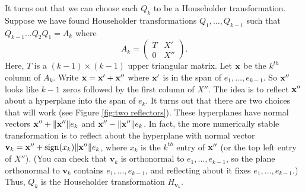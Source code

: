 It turns out that we can choose each $Q_k$ to be a Householder transformation. 
Suppose we have found Householder transformations $Q_1, \ldots, Q_{k-1}$ such that $Q_{k-1}\ldots Q_2Q_1 = A_k$ where 
\[
A_k = \begin{pmatrix}
T & X' \\
0 & X''
\end{pmatrix}.
\]
Here, $T$ is a $(k-1) \times (k-1)$ upper triangular matrix. 
Let ${\bf x}$ be the $k^{th}$ column of $A_k$. 
Write ${\bf x} = {\bf x}' + {\bf x}''$ where ${\bf x}'$ is in the span of $e_1, \ldots, e_{k-1}$. 
So ${\bf x}''$ looks like $k-1$ zeros followed by the first column of $X''$. 
The idea is to reflect ${\bf x}''$ about a hyperplane into the span of $e_k$. 
It turns out that there are two choices that will work (see Figure \ref{fig:two reflectors}). 
These hyperplanes have normal vectors ${\bf x}'' + \| {\bf x}'' \|e_k$ and ${\bf x}'' - \| {\bf x}'' \|e_k$.
In fact, the more numerically stable transformation is to reflect about the hyperplane with normal vector $\mathbf{v}_k = {\bf x}'' +\operatorname{sign}(x_k) \| {\bf x}'' \|e_k$, where $x_k$ is the $k^{th}$ entry of ${\bf x}''$ (or the top left entry of $X''$). 
(You can check that $\mathbf{v}_k$ is orthonormal to $e_1, \ldots, e_{k-1}$, so the plane orthonormal to $\mathbf{v}_k$ contains $e_1, \ldots, e_{k-1}$, and reflecting about it fixes $e_1, \ldots, e_{k-1}$.)
Thus, $Q_k$ is the Householder transformation $H_{\mathbf{v}_k}$.

